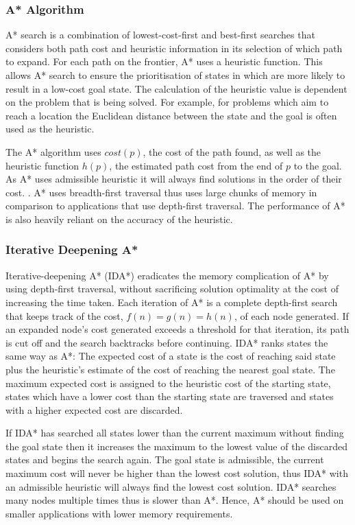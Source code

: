 \documentclass[final]{cmpreport}
\begin{document}
\subsubsection{A* Algorithm}
A* search is a combination of lowest-cost-first and best-first searches that considers both path cost and heuristic information in its selection of which path to expand. For each path on the frontier, A* uses a heuristic function. This allows A* search to ensure the prioritisation of states in which are more likely to result in a low-cost goal state. The calculation of the heuristic value is dependent on the problem that is being solved. For example, for problems which aim to reach a location the Euclidean distance between the state and the goal is often used as the heuristic. 

The A* algorithm uses $cost(p)$, the cost of the path found, as well as the heuristic function $h(p)$, the estimated path cost from the end of $p$ to the goal. As A* uses admissible heuristic it will always find solutions in the order of their cost. \citep{DBLP:journals/ker/Brewka96}.  A* uses breadth-first traversal thus uses large chunks of memory in comparison to applications that use depth-first traversal. The performance of A* is also heavily reliant on the accuracy of the heuristic.






\subsubsection{Iterative Deepening A*}
Iterative-deepening A* (IDA*) eradicates the memory complication of A* by using depth-first traversal, without sacrificing solution optimality at the cost of increasing the time taken. Each iteration of A* is a complete depth-first search that keeps track of the cost, $f(n) = g(n) = h(n)$, of each node generated. If an expanded node's cost generated exceeds a threshold for that iteration, its path is cut off and the search backtracks before continuing. IDA* ranks states the same way as A*: The expected cost of a state is the cost of reaching said state plus the heuristic's estimate of the cost of reaching the nearest goal state. The maximum expected cost is assigned to the heuristic cost of the starting state, states which have a lower cost than the starting state are traversed and states with a higher expected cost are discarded. 


If IDA* has searched all states lower than the current maximum without finding the goal state then it increases the maximum to the lowest value of the discarded states and begins the search again. The goal state is admissible, the current maximum cost will never be higher than the lowest cost solution, thus IDA* with an admissible heuristic will always find the lowest cost solution.  IDA* searches many nodes multiple times thus is slower than A*. Hence, A* should be used on smaller applications with lower memory requirements.
\end{document}
